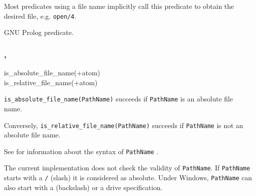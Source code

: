 Most predicates using a file name implicitly call this predicate to obtain
the desired file, e.g. \texttt{open/4}.

\begin{PlErrors}





\end{PlErrors}

\Portability

GNU Prolog predicate.

\subsubsection{,
               }

\begin{TemplatesOneCol}
is\_absolute\_file\_name(+atom)\\
is\_relative\_file\_name(+atom)

\end{TemplatesOneCol}

\Description

\texttt{is\_absolute\_file\_name(PathName)} succeeds if \texttt{PathName} is
an absolute file name. 

Conversely, \texttt{is\_relative\_file\_name(PathName)} succeeds if
\texttt{PathName} is not an absolute file name.

See  for information about the syntax of
\texttt{PathName} .

The current implementation does not check the validity of
\texttt{PathName}. If \texttt{PathName} starts with a \texttt{/} (slash) it
is considered as absolute. Under Windows, \texttt{PathName} can also start
with a \texttt{{\bs}} (backslash) or a drive specification.

\begin{PlErrors}



\end{PlErrors}

